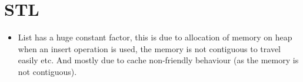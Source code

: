 \documentclass[../Notes.tex]{subfiles}
\begin{document}
\section{STL}
\begin{itemize}
	\item List has a huge constant factor, this is due to allocation of memory on heap when an insert operation is used, the memory is not contiguous to travel easily etc. And mostly due to cache non-friendly behaviour (as the memory is not contiguous).
\end{itemize}
\end{document}
